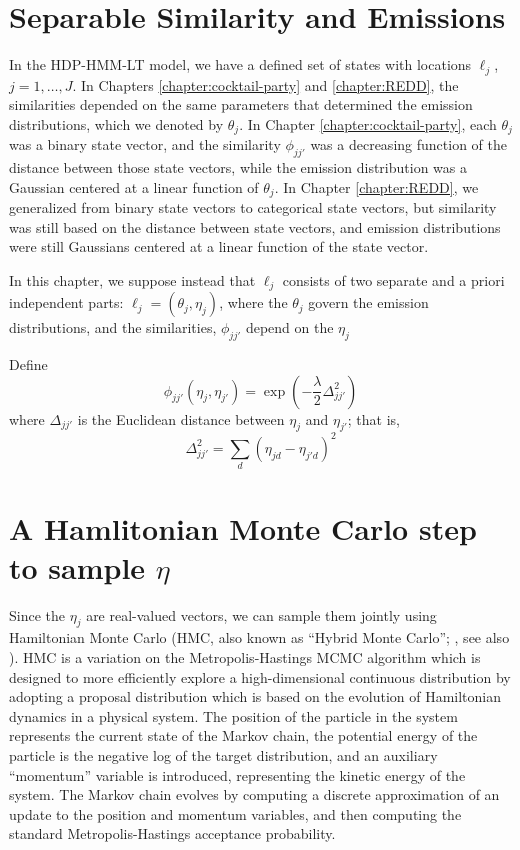 \section{Separable Similarity and Emissions}
\label{sec:separ-simil-emiss}

In the HDP-HMM-LT model, we have a defined set of states with 
locations $\ell_j$, $j = 1, \dots,
J$.  In Chapters \ref{chapter:cocktail-party} and \ref{chapter:REDD}, the similarities depended on the same parameters that determined the emission distributions, which we denoted by $\theta_j$.  In Chapter \ref{chapter:cocktail-party},
each $\theta_j$ was a binary state vector, and the similarity $\phi_{jj'}$ was a decreasing function of the distance between those state vectors, while the emission distribution was a Gaussian centered at a linear function of $\theta_j$.  In Chapter \ref{chapter:REDD}, we generalized from binary state vectors to categorical state vectors, but similarity was still based on the distance between state vectors, and emission distributions were still Gaussians centered at a linear function of the state vector.

In this chapter, we suppose instead that $\ell_{j}$ consists of two separate and a priori independent parts: $\ell_j = (\theta_{j}, \eta_{j})$, where the $\theta_j$ govern the emission distributions, and the similarities, $\phi_{jj'}$ depend on the $\eta_j$

Define
\begin{equation*}
  \phi_{jj'}(\eta_j, \eta_{j'}) = \exp\left(-\frac{\lambda}{2} \Delta_{jj'}^2\right)
\end{equation*}
where $\Delta_{jj'}$ is the Euclidean distance between $\eta_j$ and
$\eta_{j'}$; that is,
\begin{equation*}
  \Delta_{jj'}^2 = \sum_{d} (\eta_{jd} - \eta_{j'd})^2
\end{equation*}

\section{A Hamlitonian Monte Carlo step to sample $\eta$}
\label{sec:haml-monte-carlo}

Since the $\eta_j$ are real-valued vectors, we can sample them jointly using Hamiltonian Monte Carlo (HMC, also known as ``Hybrid Monte Carlo''; \citet{duane1987hybrid}, see also \citet{neal2011mcmc}).  HMC is a variation on the Metropolis-Hastings MCMC 
algorithm which is designed to more efficiently explore a high-dimensional continuous distribution by adopting a proposal distribution which is based on the evolution of Hamiltonian dynamics in a physical system.  The position of the particle in the system represents the current state of the Markov chain, the potential energy of the particle is the negative log of the target distribution, and an auxiliary ``momentum'' variable is introduced, representing the kinetic energy of the system.  The Markov chain evolves by computing a discrete approximation of an update to the position and momentum variables, and then computing the standard Metropolis-Hastings acceptance probability.

